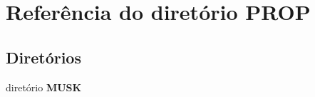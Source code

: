 \section{Referência do diretório P\+R\+OP}
\label{dir_13ce743577026276c20070a5eed080e9}
\subsection*{Diretórios}
\begin{DoxyCompactItemize}
\item 
diretório {\bf M\+U\+SK}
\end{DoxyCompactItemize}
